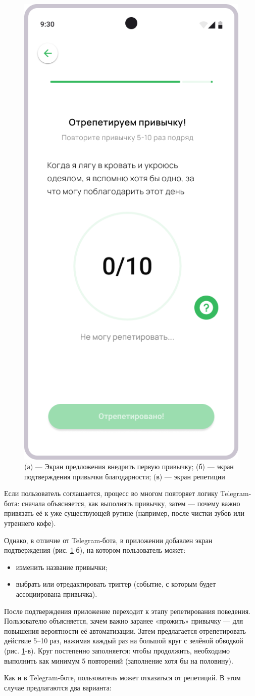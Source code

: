 \documentclass[pdflatex,sn-mathphys-num]{sn-jnl}%
\theoremstyle{thmstyleone}%
\theoremstyle{thmstyletwo}%
\theoremstyle{thmstylethree}%
\begin{document}
\begin{figure}
    \includegraphics[width=0.32\linewidth]{figures/App/Onboarding_7.png}
    \caption{(а) — Экран предложения внедрить первую привычку; (б) — экран подтверждения привычки благодарности; (в) — экран репетиции}
    \label{fig:onboarding_1}
\end{figure}

Если пользователь соглашается, процесс во многом повторяет логику Telegram-бота: сначала объясняется, как выполнять привычку, затем — почему важно привязать её к уже существующей рутине (например, после чистки зубов или утреннего кофе).

Однако, в отличие от Telegram-бота, в приложении добавлен экран подтверждения (рис. \ref{fig:onboarding_1}-б), на котором пользователь может:

\begin{itemize}
\item изменить название привычки;
\item выбрать или отредактировать триггер (событие, с которым будет ассоциирована привычка).
\end{itemize}

После подтверждения приложение переходит к этапу репетирования поведения. Пользователю объясняется, зачем важно заранее «прожить» привычку — для повышения вероятности её автоматизации. Затем предлагается отрепетировать действие 5–10 раз, нажимая каждый раз на большой круг с зелёной обводкой (рис. \ref{fig:onboarding_1}-в). Круг постепенно заполняется: чтобы продолжить, необходимо выполнить как минимум 5 повторений (заполнение хотя бы на половину).

Как и в Telegram-боте, пользователь может отказаться от репетиций. В этом случае предлагаются два варианта:
\end{document}
